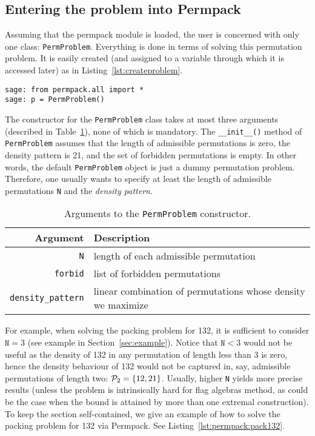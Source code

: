 \documentclass[12pt, a4paper, twoside]{report}
\begin{document}
\subsection{Entering the problem into Permpack}

Assuming that the permpack module is loaded, the user is concerned with only one class: \texttt{PermProblem}. Everything is done in terms of solving this permutation problem. It is easily created (and assigned to a variable through which it is accessed later) as in Listing~\ref{lst:createproblem}. 
 {}
\begin{lstlisting}
sage: from permpack.all import *
sage: p = PermProblem()
\end{lstlisting}

The constructor for the \texttt{PermProblem} class takes at most three arguments (described in Table~\ref{tab:argspermproblem}), none of which is mandatory. The \texttt{\_\_init\_\_()} method of \texttt{PermProblem} assumes that the length of admissible permutations is zero, the density pattern is 21, and the set of forbidden permutations is empty. In other words, the default \texttt{PermProblem} object is just a dummy permutation problem. Therefore, one usually wants to specify at least the length of admissible permutations \texttt{N} and the \emph{density pattern}.

\begin{table}[ht]
  \centering
    \begin{tabular}{r|l}
      \textbf{Argument} & \textbf{Description}\\
      \hline
      \texttt{N} & length of each admissible permutation\\
      \texttt{forbid} & list of forbidden permutations\\
      \texttt{density\_pattern} & linear combination of permutations whose density we maximize
    \end{tabular}
    \caption{Arguments to the \texttt{PermProblem} constructor.}
    \label{tab:argspermproblem}
\end{table}

For example, when solving the packing problem for 132, it is sufficient to consider $\texttt{N}=3$ (see example in Section~\ref{sec:example}). Notice that $\texttt{N}<3$ would not be useful as the density of 132 in any permutation of length less than 3 is zero, hence the density behaviour of 132 would not be captured in, say, admissible permutations of length two: $\P_2 = \{12,21\}$. Usually, higher \texttt{N} yields more precise results (unless the problem is intrinsically hard for flag algebras method, as could be the case when the bound is attained by more than one extremal construction). To keep the section self-contained, we give an example of how to solve the packing problem for 132 via Permpack. See Listing~\ref{lst:permpack:pack132}.
\end{document}
